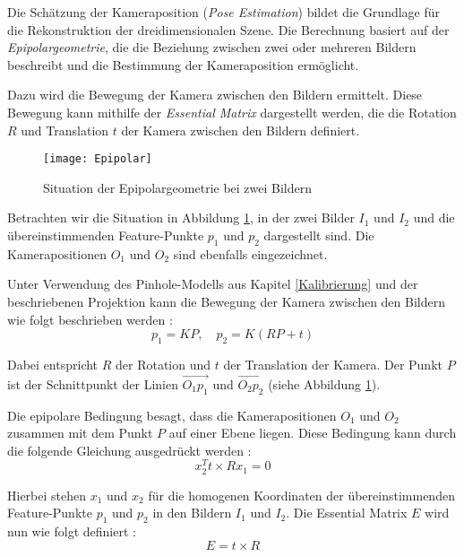 Die Schätzung der Kameraposition (\emph{Pose Estimation}) bildet die Grundlage für die Rekonstruktion der dreidimensionalen Szene. Die Berechnung basiert auf der \emph{Epipolargeometrie}, die die Beziehung zwischen zwei oder mehreren Bildern beschreibt und die Bestimmung der Kameraposition ermöglicht. \cite{gao2021vSLAM} 

Dazu wird die Bewegung der Kamera zwischen den Bildern ermittelt. Diese Bewegung kann mithilfe der \emph{Essential Matrix} dargestellt werden, die die Rotation \( R \) und Translation \( t \) der Kamera zwischen den Bildern definiert. \cite{gao2021vSLAM}

\begin{figure}[h]
    \centering
    \texttt{[image: Epipolar]}
    \caption{Situation der Epipolargeometrie bei zwei Bildern \cite{gao2021vSLAM}\label{fig:Epipolar}}\par
\end{figure}

Betrachten wir die Situation in Abbildung \ref{fig:Epipolar}, in der zwei Bilder \( I_1 \) und \( I_2 \) und die übereinstimmenden Feature-Punkte \( p_1 \) und \( p_2 \) dargestellt sind. Die Kamerapositionen \( O_1 \) und \( O_2 \) sind ebenfalls eingezeichnet. \cite{gao2021vSLAM}

Unter Verwendung des Pinhole-Modells aus Kapitel \ref{Kalibrierung} und der beschriebenen Projektion kann die Bewegung der Kamera zwischen den Bildern wie folgt beschrieben werden \cite{gao2021vSLAM}:
\begin{equation}
    p_1 = KP, \quad p_2 = K(RP + t)
\end{equation}

Dabei entspricht \( R \) der Rotation und \( t \) der Translation der Kamera. Der Punkt \( P \) ist der Schnittpunkt der Linien \( \overrightarrow{O_1p_1} \) und \( \overrightarrow{O_2p_2} \) (siehe Abbildung \ref{fig:Epipolar}). \cite{gao2021vSLAM}

Die epipolare Bedingung besagt, dass die Kamerapositionen \( O_1 \) und \( O_2 \) zusammen mit dem Punkt \( P \) auf einer Ebene liegen. Diese Bedingung kann durch die folgende Gleichung ausgedrückt werden \cite{gao2021vSLAM}:
\begin{equation}
    x_2^T t \times R x_1 = 0\label{eq:Epipolar}
\end{equation}

Hierbei stehen \( x_1 \) und \( x_2 \) für die homogenen Koordinaten der übereinstimmenden Feature-Punkte \( p_1 \) und \( p_2 \) in den Bildern \( I_1 \) und \( I_2 \). Die Essential Matrix \( E \) wird nun wie folgt definiert \cite{gao2021vSLAM}:
\begin{equation}
    E = t \times R
\end{equation}

